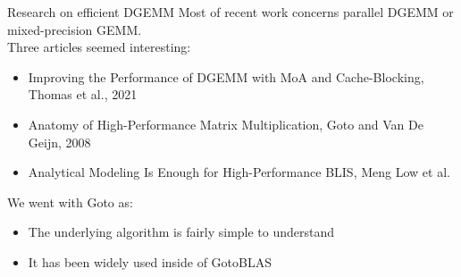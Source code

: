 \begin{frame}{Research on efficient DGEMM}
    Most of recent work concerns parallel DGEMM or mixed-precision GEMM.\\
    Three articles seemed interesting:
    \begin{itemize}
        \item Improving the Performance of DGEMM with MoA and Cache-Blocking, Thomas et al., 2021
        \item Anatomy of High-Performance Matrix Multiplication, Goto and Van De Geijn, 2008
        \item Analytical Modeling Is Enough for High-Performance BLIS, Meng Low et al.
    \end{itemize}
    We went with Goto as:
    \begin{itemize}
        \item The underlying algorithm is fairly simple to understand
        \item It has been widely used inside of GotoBLAS
    \end{itemize}
\end{frame}
